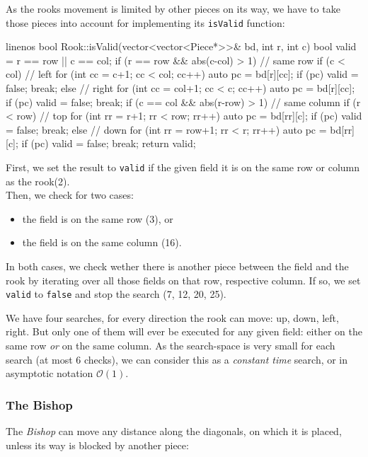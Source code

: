 As the rooks movement is limited by other pieces on its way, we have to take those pieces
into account for implementing its \texttt{isValid} function:

\begin{cpp*}{linenos}
bool Rook::isValid(vector<vector<Piece*>>& bd, int r, int c) {
  bool valid = r == row || c == col;
  if (r == row && abs(c-col) > 1) { // same row
    if (c < col) { // left
      for (int cc = c+1; cc < col; cc++) {
        auto pc = bd[r][cc];
        if (pc) { valid = false; break; }
      }
    } else { // right
      for (int cc = col+1; cc < c; cc++) {
        auto pc = bd[r][cc];
        if (pc) { valid = false; break; }
      }
    }
  }
  if (c == col && abs(r-row) > 1) { // same column
    if (r < row) { // top
      for (int rr = r+1; rr < row; rr++) {
        auto pc = bd[rr][c];
        if (pc) { valid = false; break; }
      }
    } else { // down
      for (int rr = row+1; rr < r; rr++) {
        auto pc = bd[rr][c];
        if (pc) { valid = false; break; }
      }
    }
  }
  return valid;
}
\end{cpp*}

First, we set the result to \texttt{valid} if the given field it is on the same row
or column as the rook(2).\\
Then, we check for two cases:
\begin{itemize}
  \item the field is on the same row (3), or
  \item the field is on the same column (16).
\end{itemize}

In both cases, we check wether there is another piece between the field and the rook by
iterating over all those fields on that row, respective column.
If so, we set \texttt{valid} to \texttt{false} and stop the search (7, 12, 20, 25).

We have four searches, for every direction the rook can move: up, down, left, right.
But only one of them will ever be executed for any given field: either on the same row \emph{or}
on the same column.
As the search-space is very small for each search (at most 6 checks), we can consider this as a
\emph{constant time} search, or in asymptotic notation $\mathcal{O}(1)$.

\subsubsection{The Bishop}
The \emph{Bishop} can move any distance along the diagonals, on which it is placed,
unless its way is blocked by another piece:

